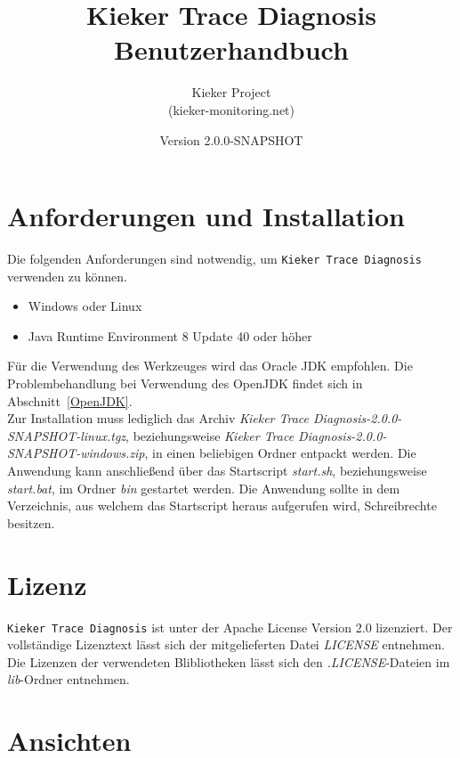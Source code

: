 \documentclass{article}
\begin{document}
  \newcommand{\version}[0]{2.0.0-SNAPSHOT}
  \newcommand{\KiekerTraceDiagnosis}[0]{\texttt{Kieker Trace Diagnosis}}
  \newcommand{\file}[1]{\textit{#1}}

  \title{Kieker Trace Diagnosis\\Benutzerhandbuch}
  \date{Version \version{}}
  \author{Kieker Project\\(kieker-monitoring.net)}

  \maketitle

  \section{Anforderungen und Installation}
  Die folgenden Anforderungen sind notwendig, um \KiekerTraceDiagnosis{} verwenden zu können.
  \begin{itemize}
    \item Windows oder Linux
    \item Java Runtime Environment 8 Update 40 oder höher
  \end{itemize}
  Für die Verwendung des Werkzeuges wird das Oracle JDK empfohlen. Die Problembehandlung bei Verwendung des OpenJDK findet sich in Abschnitt~\ref{OpenJDK}.\\

  Zur Installation muss lediglich das Archiv \file{Kieker Trace Diagnosis-\version{}-linux.tgz}, beziehungsweise \file{Kieker Trace Diagnosis-\version{}-windows.zip}, in einen beliebigen Ordner entpackt werden.
  Die Anwendung kann anschließend über das Startscript \file{start.sh}, beziehungsweise \file{start.bat}, im Ordner \file{bin} gestartet werden.
  Die Anwendung sollte in dem Verzeichnis, aus welchem das Startscript heraus aufgerufen wird, Schreibrechte besitzen.

  \section{Lizenz}

  \KiekerTraceDiagnosis{} ist unter der Apache License Version 2.0 lizenziert.
  Der vollständige Lizenztext lässt sich der mitgelieferten Datei \file{LICENSE} entnehmen.
  Die Lizenzen der verwendeten Blibliotheken lässt sich den \file{.LICENSE}-Dateien im \file{lib}-Ordner entnehmen.

  \section{Ansichten}
\end{document}
